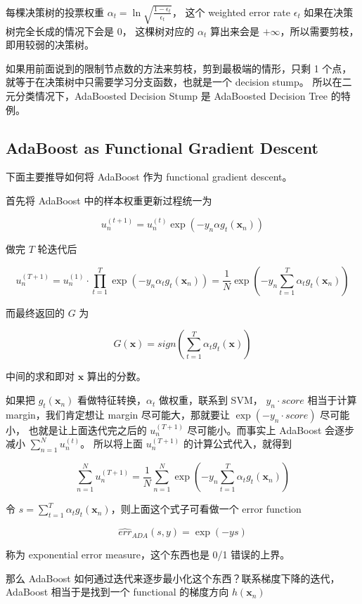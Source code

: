 \documentclass[a4paper]{article}
\begin{document}
每棵决策树的投票权重 $\displaystyle \alpha_t = \ln{\sqrt{\frac{1-\epsilon_t}{\epsilon_t}}}$，
这个 weighted error rate $\epsilon_t$ 如果在决策树完全长成的情况下会是 0，
这棵树对应的 $\alpha_t$ 算出来会是 $+\infty$，所以需要剪枝，即用较弱的决策树。

如果用前面说到的限制节点数的方法来剪枝，剪到最极端的情形，只剩 1 个点，
就等于在决策树中只需要学习分支函数，也就是一个 decision stump。
所以在二元分类情况下，AdaBoosted Decision Stump 是 AdaBoosted Decision Tree 的特例。


\subsection{AdaBoost as Functional Gradient Descent}
下面主要推导如何将 AdaBoost 作为 functional gradient descent。

首先将 AdaBoost 中的样本权重更新过程统一为

$$u_n^{(t+1)} = u_n^{(t)}\exp(-y_n \alpha g_t(\mathbf{x}_n))$$

做完 $T$ 轮迭代后

$$u_n^{(T+1)} = u_n^{(1)} \cdot \prod_{t=1}^{T}\exp(-y_n \alpha_t g_t(\mathbf{x}_n)) = \frac{1}{N}\exp\left ( -y_n \sum_{t=1}^{T}\alpha_t g_t(\mathbf{x}_n) \right )$$

而最终返回的 $G$ 为

$$G(\mathbf{x}) = sign\left (\sum_{t=1}^{T}\alpha_t g_t(\mathbf{x})  \right )$$

中间的求和即对 $\mathbf{x}$ 算出的分数。

如果把 $g_t(\mathbf{x}_n)$ 看做特征转换，$\alpha_t$ 做权重，联系到 SVM，
$y_n \cdot score$ 相当于计算 margin，我们肯定想让 margin 尽可能大，那就要让 $\exp(-y_n \cdot score)$ 尽可能小，
也就是让上面迭代完之后的 $u_n^{(T+1)}$ 尽可能小。而事实上 AdaBoost 会逐步减小 $\displaystyle \sum_{n=1}^{N}u_n^{(t)}$。
所以将上面 $u_n^{(T+1)}$ 的计算公式代入，就得到

$$\sum_{n=1}^{N}u_n^{(T+1)} = \frac{1}{N}\sum_{n=1}^{N}\exp\left ( -y_n \sum_{t=1}^{T}\alpha_t g_t(\mathbf{x}_n) \right )$$

令 $\displaystyle s = \sum_{t=1}^{T}\alpha_t g_t(\mathbf{x}_n)$，则上面这个式子可看做一个 error function

$$\widehat{err}_{ADA}(s, y) = \exp(-ys)$$

称为 exponential error measure，这个东西也是 0/1 错误的上界。

那么 AdaBoost 如何通过迭代来逐步最小化这个东西？联系梯度下降的迭代，
AdaBoost 相当于是找到一个 functional 的梯度方向 $h(\mathbf{x}_n)$
\end{document}
